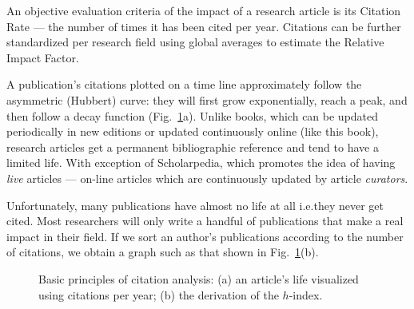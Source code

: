 \documentclass[graybox,envcountchap,sectrefs,UStrade]{svmono}
\begin{document}
\begin{svgraybox}
An objective evaluation criteria of the impact of a research article is its Citation Rate --- the number of times it has been cited per year. Citations can be further standardized per research field using global averages to estimate the Relative Impact Factor.
\end{svgraybox}

A publication's citations plotted on a time line approximately follow the asymmetric (Hubbert) curve: they will first grow exponentially, reach a peak, and then follow a decay function (Fig.\@~\ref{Fig:citations_h_index}a). Unlike books, which can be updated periodically in new editions or updated continuously online (like this book), research articles get a permanent bibliographic reference and tend to have a limited life. With exception of Scholarpedia, which promotes the idea of having \emph{live} articles --- on-line articles which are continuously updated by article \emph{curators}.\par

Unfortunately, many publications have almost no life at all i.e.\@ they never get cited. Most researchers will only write a handful of publications that make a real impact in their field. If we sort an author's publications according to the number of citations, we obtain a graph such as that shown in Fig.\@~\ref{Fig:citations_h_index}(b).\par

\begin{figure}[!hbt]
\begin{center}
\caption{Basic principles of citation analysis: (a) an article's life visualized using citations per year; (b) the derivation of the $h$-index.}
\label{Fig:citations_h_index}
\end{center}
\end{figure}
\end{document}
